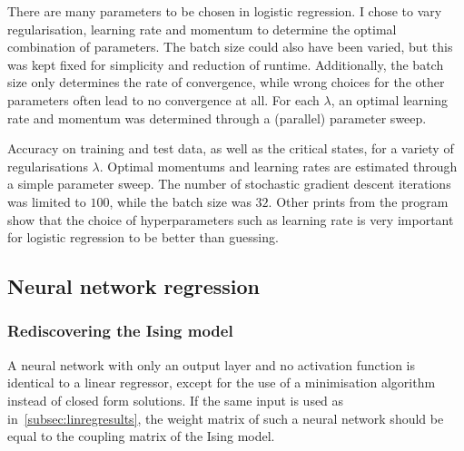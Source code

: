 \documentclass[11pt,british,a4paper]{article}
\numberwithin{equation}{section}
\begin{document}
There are many parameters to be chosen in logistic regression. I chose to vary regularisation, learning rate and momentum to determine the optimal combination of parameters. The batch size could also have been varied, but this was kept fixed for simplicity and reduction of runtime. Additionally, the batch size only determines the rate of convergence, while wrong choices for the other parameters often lead to no convergence at all. For each \(\lambda\), an optimal learning rate and momentum was determined through a (parallel) parameter sweep.

\begin{table}[H]
    \centering
    \caption{Accuracy on training and test data, as well as the critical states, for a variety of regularisations \(\lambda\). Optimal momentums and learning rates are estimated through a simple parameter sweep. The number of stochastic gradient descent iterations was limited to \(100\), while the batch size was \(32\). Other prints from the program show that the choice of hyperparameters such as learning rate is very important for logistic regression to be better than guessing.}
\end{table}

\subsection{Neural network regression}
\subsubsection{Rediscovering the Ising model}
A neural network with only an output layer and no activation function is identical to a linear regressor, except for the use of a minimisation algorithm instead of closed form solutions.
If the same input is used as in~\vref{subsec:linregresults}, the weight matrix of such a neural network should be equal to the coupling matrix of the Ising model.
\end{document}

